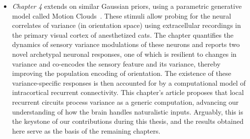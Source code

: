\begin{itemize}
\item \textit{Chapter 4} extends on similar Gaussian priors, using a parametric generative model called Motion Clouds~\cite{leon2012motion}. These stimuli allow probing for the neural correlates of variance (in orientation space) using extracellular recordings in the primary visual cortex of anesthetized cats. The chapter quantifies the dynamics of sensory variance modulations of these neurons and reports two novel archetypal neuronal responses, one of which is resilient to changes in variance and co-encodes the sensory feature and its variance, thereby improving the population encoding of orientation. The existence of these variance-specific responses is then accounted for by a computational model of intracortical recurrent connectivity. This chapter's article proposes that local recurrent circuits process variance as a generic computation, advancing our understanding of how the brain handles naturalistic inputs. Arguably, this is the keystone of our contributions during this thesis, and the results obtained here serve as the basis of the remaining chapters.



\end{itemize}
